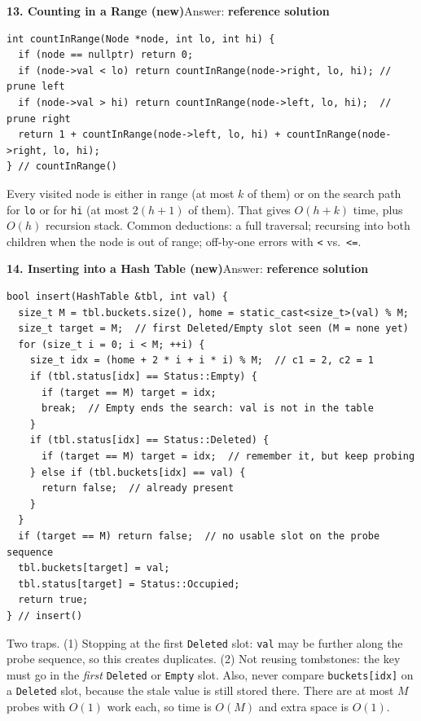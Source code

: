 \documentclass[11pt]{article}
\newcommand{\answer}[2]{\par\medskip\noindent\textbf{#1}\quad Answer: \textbf{#2}\par\nobreak\smallskip}
\begin{document}
\answer{13. Counting in a Range (new)}{reference solution}
\begin{lstlisting}
int countInRange(Node *node, int lo, int hi) {
  if (node == nullptr) return 0;
  if (node->val < lo) return countInRange(node->right, lo, hi); // prune left
  if (node->val > hi) return countInRange(node->left, lo, hi);  // prune right
  return 1 + countInRange(node->left, lo, hi) + countInRange(node->right, lo, hi);
} // countInRange()
\end{lstlisting}
Every visited node is either in range (at most $k$ of them) or on the search path for \texttt{lo} or for \texttt{hi} (at most $2(h+1)$ of them).
That gives $O(h+k)$ time, plus $O(h)$ recursion stack. Common deductions: a full traversal; recursing into both children when
the node is out of range; off-by-one errors with \texttt{<} vs.\ \texttt{<=}.

\answer{14. Inserting into a Hash Table (new)}{reference solution}
\begin{lstlisting}
bool insert(HashTable &tbl, int val) {
  size_t M = tbl.buckets.size(), home = static_cast<size_t>(val) % M;
  size_t target = M;  // first Deleted/Empty slot seen (M = none yet)
  for (size_t i = 0; i < M; ++i) {
    size_t idx = (home + 2 * i + i * i) % M;  // c1 = 2, c2 = 1
    if (tbl.status[idx] == Status::Empty) {
      if (target == M) target = idx;
      break;  // Empty ends the search: val is not in the table
    }
    if (tbl.status[idx] == Status::Deleted) {
      if (target == M) target = idx;  // remember it, but keep probing
    } else if (tbl.buckets[idx] == val) {
      return false;  // already present
    }
  }
  if (target == M) return false;  // no usable slot on the probe sequence
  tbl.buckets[target] = val;
  tbl.status[target] = Status::Occupied;
  return true;
} // insert()
\end{lstlisting}
Two traps. (1) Stopping at the first \texttt{Deleted} slot: \texttt{val} may be further along the probe sequence, so this
creates duplicates. (2) Not reusing tombstones: the key must go in the \emph{first} \texttt{Deleted} or \texttt{Empty} slot.
Also, never compare \texttt{buckets[idx]} on a \texttt{Deleted} slot, because the stale value is still stored there.
There are at most $M$ probes with $O(1)$ work each, so time is $O(M)$ and extra space is $O(1)$.
\end{document}
